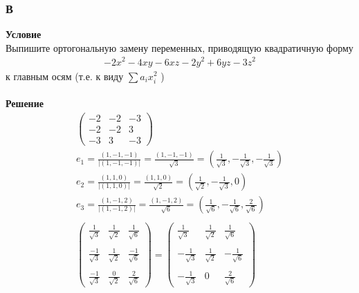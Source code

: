 		\subsubsection*{\textbf{В}}
		\textbf{Условие}\\
		Выпишите ортогональную замену переменных, приводящую квадратичную форму
		\begin{gather*}
			-2 x^{2}-4 x y-6 x z-2 y^{2}+6 y z-3 z^{2}
		\end{gather*}
		к главным осям (т.е. к виду $\sum a_{i} x_{i}^{2}$ )\\
		\\
		\textbf{Решение}\\
		\begin{gather*}
			\begin{pmatrix}
				-2 & -2 & -3\\
				-2 & -2 & 3\\
				-3 & 3 & -3
			\end{pmatrix}\\
			e_1 = \frac{(1,-1,-1)}{|(1,-1,-1)|} = \frac{(1,-1,-1)}{\sqrt{3}} = (\frac{1}{\sqrt{3}},-\frac{1}{\sqrt{3}},-\frac{1}{\sqrt{3}})\\
			e_2 = \frac{(1,1,0)}{|(1,1,0)|} = \frac{(1,1,0)}{\sqrt{2}} = (\frac{1}{\sqrt{2}},-\frac{1}{\sqrt{3}},0)\\
			e_3 = \frac{(1,-1,2)}{|(1,-1,2)|} = \frac{(1,-1,2)}{\sqrt{6}} = (\frac{1}{\sqrt{6}},-\frac{1}{\sqrt{6}},\frac{2}{\sqrt{6}})\\
			\\
			\begin{pmatrix}
				\frac{1}{\sqrt{3}} & \frac{1}{\sqrt{2}} & \frac{1}{\sqrt{6}}\\
				\\
				\frac{-1}{\sqrt{3}} & \frac{1}{\sqrt{2}} & \frac{-1}{\sqrt{6}}\\
				\\
				\frac{-1}{\sqrt{3}} & \frac{0}{\sqrt{2}} & \frac{2}{\sqrt{6}}
			\end{pmatrix}
			=
			\begin{pmatrix}
				\frac{1}{\sqrt{3}} & \frac{1}{\sqrt{2}} & \frac{1}{\sqrt{6}}\\
				\\
				-\frac{1}{\sqrt{3}} & \frac{1}{\sqrt{2}} & -\frac{1}{\sqrt{6}}\\
				\\
				-\frac{1}{\sqrt{3}} & 0 & \frac{2}{\sqrt{6}}
			\end{pmatrix}
		\end{gather*}
		
